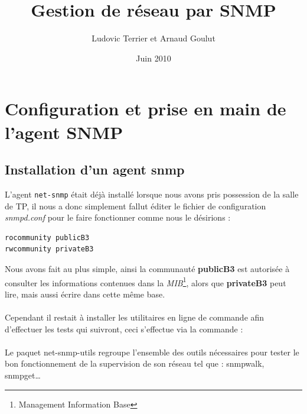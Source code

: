 \documentclass[12pt,a4paper,notitlepage]{article}
\begin{document}
\title{Gestion de réseau par SNMP}
\author{Ludovic Terrier et Arnaud Goulut}
\date{Juin 2010}
\maketitle



\thispagestyle{empty}


 
\section{Configuration et prise en main de l'agent SNMP}

\subsection{Installation d'un agent snmp}
L'agent \texttt{net-snmp} était déjà installé lorsque nous avons pris possession de la salle de TP, il nous a donc simplement fallut éditer le fichier de configuration \textit{snmpd.conf} pour le faire fonctionner comme nous le désirions :
\begin{lstlisting}[title=snmpd.conf]
rocommunity publicB3
rwcommunity privateB3
\end{lstlisting}

Nous avons fait au plus simple, ainsi la communauté \textbf{publicB3} est autorisée à consulter les informations contenues dans la \textit{MIB}\footnote{Management Information Base}, alors que \textbf{privateB3} peut lire, mais aussi écrire dans cette même base.


\paragraph{}Cependant il restait à installer les utilitaires en ligne de commande afin d'effectuer les tests qui suivront, ceci s'effectue via la commande :\\

\noindent {}

\paragraph{}Le paquet net-snmp-utils regroupe l'ensemble des outils nécessaires pour tester le bon fonctionnement de la supervision de son réseau tel que : snmpwalk, snmpget\ldots 
\end{document}
